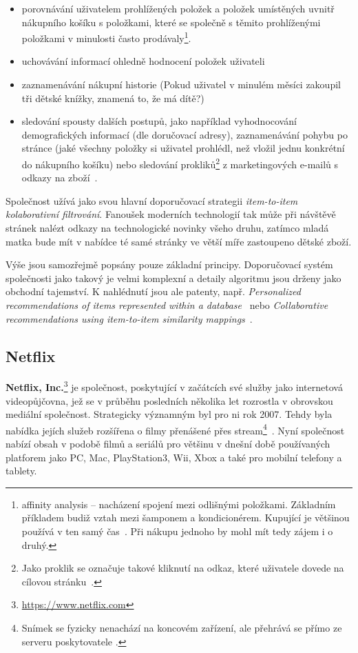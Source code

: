 \documentclass[thesis=M,czech]{FITthesis}[2014/05/07]
\begin{document}
\begin{itemize}
	\item porovnávání uživatelem prohlížených položek a položek umístěných uvnitř nákupního košíku s položkami, které se společně s těmito prohlíženými položkami v minulosti často prodávaly\footnote{affinity analysis – nacházení spojení mezi odlišnými položkami. Základním příkladem budiž vztah mezi šamponem a kondicionérem. Kupující je většinou používá v ten samý čas~\cite{affinity}. Při nákupu jednoho by mohl mít tedy zájem i o druhý.}.
	\item uchovávání informací ohledně hodnocení položek uživateli
	\item zaznamenávání nákupní historie (Pokud uživatel v minulém měsíci zakoupil tři dětské knížky, znamená to, že má dítě?)
	\item sledování spousty dalších postupů, jako například vyhodnocování demografických informací (dle doručovací adresy), zaznamenávání pohybu po stránce (jaké všechny položky si uživatel prohlédl, než vložil jednu konkrétní do nákupního košíku) nebo sledování prokliků\footnote{Jako proklik se označuje takové kliknutí na odkaz, které uživatele dovede na cílovou stránku~\cite{proklik}.} z marketingových e-mailů s odkazy na zboží~\cite{amazonrec}.
\end{itemize}

Společnost užívá jako svou hlavní doporučovací strategii \emph{item-to-item kolaborativní filtrování}. Fanoušek moderních technologií tak může při návštěvě stránek nalézt odkazy na technologické novinky všeho druhu, zatímco mladá matka bude mít v nabídce té samé stránky ve větší míře zastoupeno dětské zboží.
 
Výše jsou samozřejmě popsány pouze základní principy. Doporučovací systém společnosti jako takový je velmi komplexní a detaily algoritmu jsou drženy jako obchodní tajemství. K nahlédnutí jsou ale patenty, např. \emph{Personalized recommendations of items represented within a database}~\cite{jacobi2006personalized} nebo \emph{Collaborative recommendations using item-to-item similarity mappings}~\cite{linden2001collaborative}.

\subsection{Netflix}

\textbf{Netflix, Inc.}\footnote{\url{https://www.netflix.com}} je společnost, poskytující v začátcích své služby jako internetová videopůjčovna, jež se v průběhu posledních několika let rozrostla v obrovskou mediální společnost. Strategicky významným byl pro ni rok 2007. Tehdy byla nabídka jejích služeb rozšířena o filmy přenášené přes stream\footnote{Snímek se fyzicky nenachází na koncovém zařízení, ale přehrává se přímo ze serveru poskytovatele .}~\cite{netflix2007}. Nyní společnost nabízí obsah v podobě filmů a seriálů pro většinu v dnešní době používaných platforem jako PC, Mac, PlayStation3, Wii, Xbox a také pro mobilní telefony a tablety. 
\end{document}
